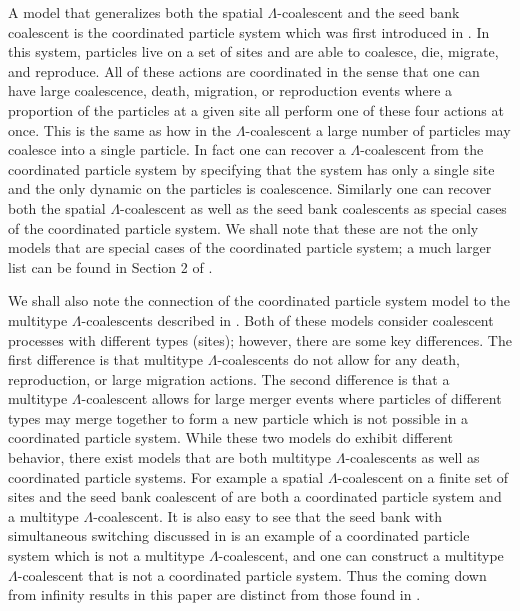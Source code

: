 \documentclass[11pt]{article}
\theoremstyle{definition}
\begin{document}
\noindent A model that generalizes both the spatial $\Lambda$-coalescent and the seed bank coalescent is the coordinated particle system which was first introduced in \cite{CPS2021}. In this system, particles live on a set of sites and are able to coalesce, die, migrate, and reproduce. All of these actions are coordinated in the sense that one can have large coalescence, death, migration, or reproduction events where a proportion of the particles at a given site all perform one of these four actions at once. This is the same as how in the $\Lambda$-coalescent a large number of particles may coalesce into a single particle. In fact one can recover a $\Lambda$-coalescent from the coordinated particle system by specifying that the system has only a single site and the only dynamic on the particles is coalescence. Similarly one can recover both the spatial $\Lambda$-coalescent as well as the seed bank coalescents as special cases of the coordinated particle system. We shall note that these are not the only models that are special cases of the coordinated particle system; a much larger list can be found in Section 2 of \cite{CPS2021}. 
\medskip

\noindent We shall also note the connection of the coordinated particle system model to the multitype $\Lambda$-coalescents described in \cite{Johnston2023}. Both of these models consider coalescent processes with different types (sites); however, there are some key differences. The first difference is that multitype $\Lambda$-coalescents do not allow for any death, reproduction, or large migration actions. The second difference is that a multitype $\Lambda$-coalescent allows for large merger events where particles of different types may merge together to form a new particle which is not possible in a coordinated particle system. While these two models do exhibit different behavior, there exist models that are both multitype $\Lambda$-coalescents as well as coordinated particle systems. For example a spatial $\Lambda$-coalescent on a finite set of sites and the seed bank coalescent of \cite{seedbank1} are both a coordinated particle system and a multitype $\Lambda$-coalescent. It is also easy to see that the seed bank with simultaneous switching discussed in \cite{seedbank2} is an example of a coordinated particle system which is not a multitype $\Lambda$-coalescent, and one can construct a multitype $\Lambda$-coalescent that is not a coordinated particle system. Thus the coming down from infinity results in this paper are distinct from those found in \cite{Johnston2023}.
\end{document}
